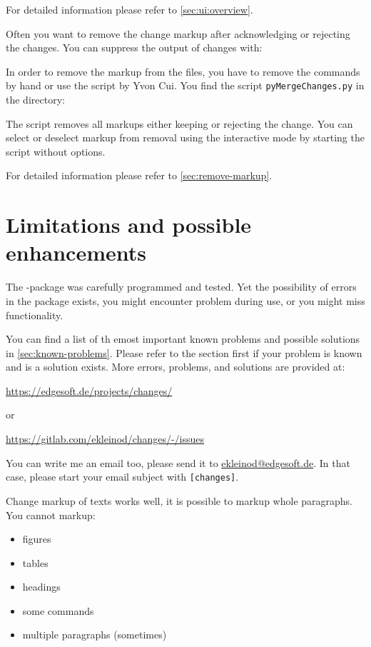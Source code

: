 For detailed information please refer to \autoref{sec:ui:overview}.



Often you want to remove the change markup after acknowledging or rejecting the changes.
You can suppress the output of changes with:


In order to remove the markup from the  files, you have to remove the commands by hand or use the script by Yvon Cui.
You find the script \texttt{pyMergeChanges.py} in the directory:


The script removes all markups either keeping or rejecting the change.
You can select or deselect markup from removal using the interactive mode by starting the script without options.

For detailed information please refer to \autoref{sec:remove-markup}.




\cleardoublepage
\section{Limitations and possible enhancements}
\label{sec:limitations}

The -package was carefully programmed and tested.
Yet the possibility of errors in the package exists, you might encounter problem during use, or you might miss functionality.

You can find a list of th emost important known problems and possible solutions in \autoref{sec:known-problems}.
Please refer to the section first if your problem is known and is a solution exists.
More errors, problems, and solutions are provided at:

\url{https://edgesoft.de/projects/changes/}

or

\url{https://gitlab.com/ekleinod/changes/-/issues}

You can write me an email too, please send it to \href{mailto:ekleinod@edgesoft.de}{ekleinod@edgesoft.de}.
In that case, please start your email subject with \texttt{[changes]}.

Change markup of texts works well, it is possible to markup whole paragraphs.
You cannot markup:

\begin{itemize}
	\item figures
	\item tables
	\item headings
	\item some commands
	\item multiple paragraphs (sometimes)
\end{itemize}

